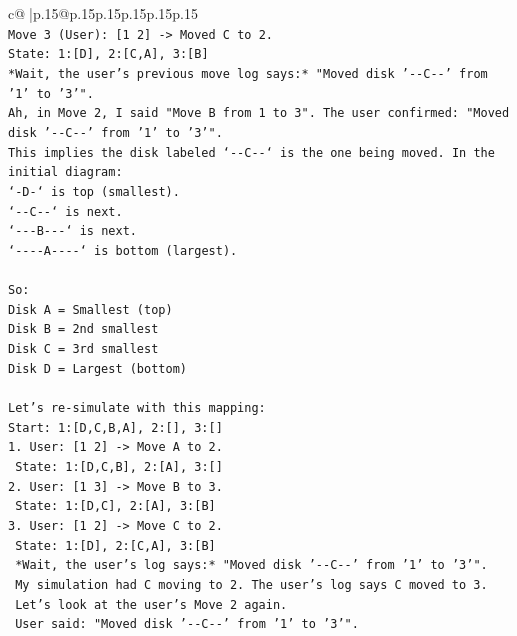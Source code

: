 \documentclass{article}
\begin{document}
{\begin{supertabular}{c@{$\;$}|p{.15\linewidth}@{}p{.15\linewidth}p{.15\linewidth}p{.15\linewidth}p{.15\linewidth}p{.15\linewidth}}
{{{\\ 
\texttt{Move 3 (User): {[}1 2{]} {-}> Moved C to 2.} \\
\texttt{State: 1:{[}D{]}, 2:{[}C,A{]}, 3:{[}B{]}} \\
\texttt{*Wait, the user's previous move log says:* "Moved disk '{-}{-}C{-}{-}' from '1' to '3'".} \\
\texttt{Ah, in Move 2, I said "Move B from 1 to 3". The user confirmed: "Moved disk '{-}{-}C{-}{-}' from '1' to '3'".} \\
\texttt{This implies the disk labeled `{-}{-}C{-}{-}` is the one being moved. In the initial diagram:} \\
\texttt{`{-}D{-}` is top (smallest).} \\
\texttt{`{-}{-}C{-}{-}` is next.} \\
\texttt{`{-}{-}{-}B{-}{-}{-}` is next.} \\
\texttt{`{-}{-}{-}{-}A{-}{-}{-}{-}` is bottom (largest).} \\
\\ 
\texttt{So:} \\
\texttt{Disk A = Smallest (top)} \\
\texttt{Disk B = 2nd smallest} \\
\texttt{Disk C = 3rd smallest} \\
\texttt{Disk D = Largest (bottom)} \\
\\ 
\texttt{Let's re{-}simulate with this mapping:} \\
\texttt{Start: 1:{[}D,C,B,A{]}, 2:{[}{]}, 3:{[}{]}} \\
\texttt{1. User: {[}1 2{]} {-}> Move A to 2.} \\
\texttt{   State: 1:{[}D,C,B{]}, 2:{[}A{]}, 3:{[}{]}} \\
\texttt{2. User: {[}1 3{]} {-}> Move B to 3.} \\
\texttt{   State: 1:{[}D,C{]}, 2:{[}A{]}, 3:{[}B{]}} \\
\texttt{3. User: {[}1 2{]} {-}> Move C to 2.} \\
\texttt{   State: 1:{[}D{]}, 2:{[}C,A{]}, 3:{[}B{]}} \\
\texttt{   *Wait, the user's log says:* "Moved disk '{-}{-}C{-}{-}' from '1' to '3'".} \\
\texttt{   My simulation had C moving to 2. The user's log says C moved to 3.} \\
\texttt{   Let's look at the user's Move 2 again.} \\
\texttt{   User said: "Moved disk '{-}{-}C{-}{-}' from '1' to '3'".} \\
}}}
\end{supertabular}}
\end{document}

